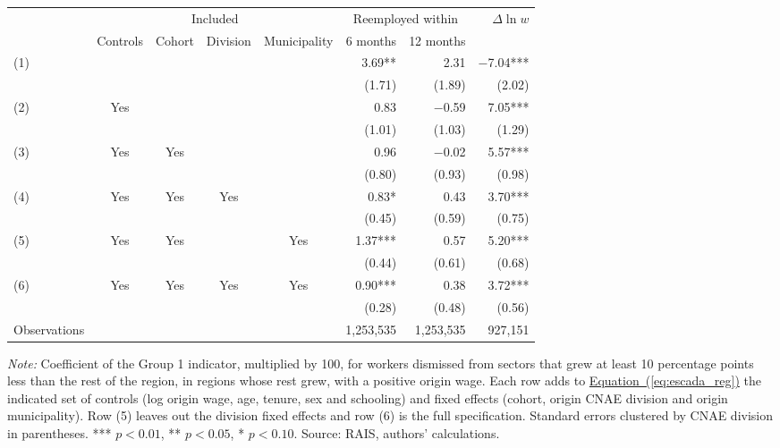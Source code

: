 {\footnotesize
\setlength{\tabcolsep}{5pt}
\begin{threeparttable}
\begin{tabular}{lccccrrr}
\toprule
 & \multicolumn{4}{c}{Included} & \multicolumn{2}{c}{Reemployed within} & $\Delta \ln w$ \\
\cmidrule(lr){2-5}\cmidrule(lr){6-7}
 & Controls & Cohort & Division & Municipality & 6 months & 12 months & \\
\midrule
(1) &  &  &  &  & 3.69** & 2.31 & $-$7.04*** \\
 & & & & & (1.71) & (1.89) & (2.02) \\
(2) & Yes &  &  &  & 0.83 & $-$0.59 & 7.05*** \\
 & & & & & (1.01) & (1.03) & (1.29) \\
(3) & Yes & Yes &  &  & 0.96 & $-$0.02 & 5.57*** \\
 & & & & & (0.80) & (0.93) & (0.98) \\
(4) & Yes & Yes & Yes &  & 0.83* & 0.43 & 3.70*** \\
 & & & & & (0.45) & (0.59) & (0.75) \\
(5) & Yes & Yes &  & Yes & 1.37*** & 0.57 & 5.20*** \\
 & & & & & (0.44) & (0.61) & (0.68) \\
(6) & Yes & Yes & Yes & Yes & 0.90*** & 0.38 & 3.72*** \\
 & & & & & (0.28) & (0.48) & (0.56) \\
\midrule
Observations & & & & & 1,253,535 & 1,253,535 & 927,151 \\
\bottomrule
\end{tabular}
\begin{tablenotes}[flushleft]\footnotesize
\item \textit{Note:} Coefficient of the Group 1 indicator, multiplied by 100, for workers dismissed from sectors that grew at least 10 percentage points less than the rest of the region, in regions whose rest grew, with a positive origin wage. Each row adds to \hyperref[eq:escada_reg]{Equation~(\ref*{eq:escada_reg})} the indicated set of controls (log origin wage, age, tenure, sex and schooling) and fixed effects (cohort, origin CNAE division and origin municipality). Row (5) leaves out the division fixed effects and row (6) is the full specification. Standard errors clustered by CNAE division in parentheses. *** $p<0.01$, ** $p<0.05$, * $p<0.10$. Source: RAIS, authors' calculations.
\end{tablenotes}
\end{threeparttable}
}
